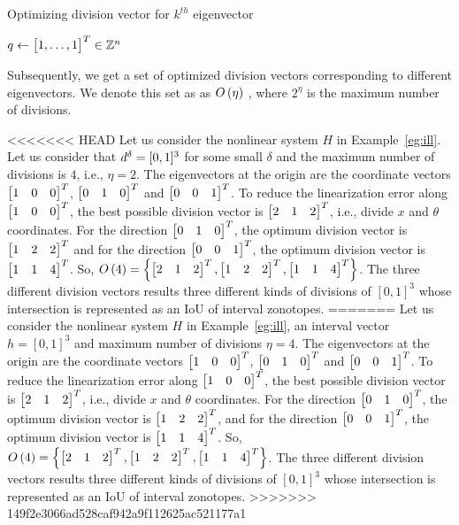 \begin{algorithm}
\caption{Optimizing division vector for $k^{th}$
eigenvector} $q\gets \begin{bmatrix}1,\ldots,1\end{bmatrix}^T\in\mathbb{Z}^n$\;
\end{algorithm}
%
Subsequently, we get a set of optimized division vectors corresponding
to different eigenvectors.  We denote this set as as $O\left(\eta\right)$ ,
where $2^\eta$ is the maximum number of divisions.
%
\begin{example}
<<<<<<< HEAD
Let us consider the nonlinear system $H$ in Example~\ref{eg:ill}.  Let
us consider that $d^\delta = [0,1]^3$ for some small $\delta$
and the maximum number of divisions is $4$, i.e., $\eta = 2$.  The
eigenvectors at the origin are the coordinate vectors $\begin{bmatrix}1 & 0
& 0\end{bmatrix}^T$, $\begin{bmatrix}0 & 1 & 0\end{bmatrix}^T$ and $\begin{bmatrix}0 & 0 & 1\end{bmatrix}^T$.  To
reduce the linearization error along $\begin{bmatrix}1 & 0 & 0\end{bmatrix}^T$, the
best possible division vector is $\begin{bmatrix}2 & 1 & 2\end{bmatrix}^T$, i.e.,
divide $x$ and $\theta$ coordinates.  For the direction $\begin{bmatrix}0 &
1 &0\end{bmatrix}^T$, the optimum division vector is $\begin{bmatrix}1 & 2 & 2\end{bmatrix}^T$ and
for the direction $\begin{bmatrix}0 & 0 & 1\end{bmatrix}^T$, the optimum division
vector is $\begin{bmatrix}1 & 1 & 4\end{bmatrix}^T$.  So, $O\left(4\right) = \left\{\begin{bmatrix}2
& 1 & 2\end{bmatrix}^T, \begin{bmatrix}1 & 2 & 2\end{bmatrix}^T, \begin{bmatrix}1 & 1 & 4\end{bmatrix}^T\right\}$.  The
three different division vectors results three different kinds of
divisions of $[0,1]^3$ whose intersection is represented as an IoU of
interval zonotopes.
=======
Let us consider the nonlinear system $H$ in Example~\ref{eg:ill}, an
interval vector $h = [0,1]^3$ and maximum number of divisions $\eta =
4$.  The eigenvectors at the origin are the coordinate vectors
$\begin{bmatrix}1 & 0 & 0\end{bmatrix}^T$, $\begin{bmatrix}0 & 1 & 0\end{bmatrix}^T$ and $\begin{bmatrix}0 &
0 & 1\end{bmatrix}^T$.  To reduce the linearization error along $\begin{bmatrix}1 & 0 &
0\end{bmatrix}^T$, the best possible division vector is $\begin{bmatrix}2 & 1 & 2\end{bmatrix}^T$,
i.e., divide $x$ and $\theta$ coordinates.  For the direction
$\begin{bmatrix}0 & 1 &0\end{bmatrix}^T$, the optimum division vector is $\begin{bmatrix}1 &
2 & 2\end{bmatrix}^T$, and for the direction $\begin{bmatrix}0 & 0 & 1\end{bmatrix}^T$, the optimum
division vector is $\begin{bmatrix}1 & 1 & 4\end{bmatrix}^T$.  So, $O\left(4\right)
= \left\{\begin{bmatrix}2 & 1 & 2\end{bmatrix}^T, \begin{bmatrix}1 & 2 & 2\end{bmatrix}^T, \begin{bmatrix}1 & 1
& 4\end{bmatrix}^T\right\}$.  The three different division vectors results three
different kinds of divisions of $[0,1]^3$ whose intersection is
represented as an IoU of interval zonotopes.
>>>>>>> 149f2e3066ad528caf942a9f112625ac521177a1
\end{example}
%
